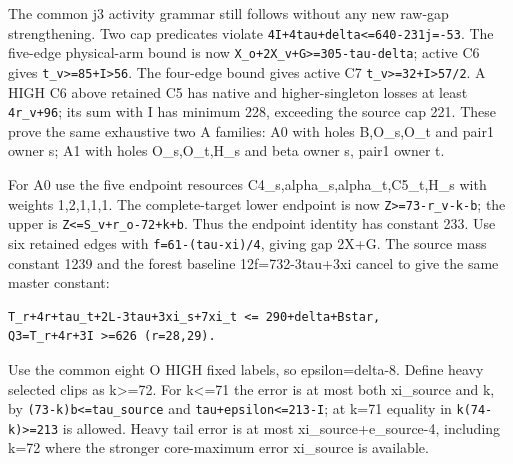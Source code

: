 \documentclass[10pt,a4paper]{article}
\theoremstyle{definition}
\begin{document}
The common j3 activity grammar still follows without any new raw-gap
strengthening. Two cap predicates violate
\texttt{4I+\allowbreak{}4tau+\allowbreak{}delta<=\allowbreak{}640-231j=\allowbreak{}-53}. The five-edge
physical-arm bound is now
\texttt{X\_\allowbreak{}\allowbreak{}o+\allowbreak{}2X\_\allowbreak{}\allowbreak{}v+\allowbreak{}G>=\allowbreak{}305-tau-delta}; active C6 gives
\texttt{t\_\allowbreak{}\allowbreak{}v>=\allowbreak{}85+\allowbreak{}I>56}. The four-edge bound gives
active C7 \texttt{t\_\allowbreak{}\allowbreak{}v>=\allowbreak{}32+\allowbreak{}I>57/\allowbreak{}2}. A HIGH C6 above
retained C5 has native and higher-singleton losses at least
\texttt{4r\_\allowbreak{}\allowbreak{}v+\allowbreak{}96}; its sum with I has minimum 228,\allowbreak{}
exceeding the source cap 221. These prove the same exhaustive two A
families: A0 with holes B,\allowbreak{}O\_\allowbreak{}s,\allowbreak{}O\_\allowbreak{}t and pair1 owner s; A1 with holes
O\_\allowbreak{}s,\allowbreak{}O\_\allowbreak{}t,\allowbreak{}H\_\allowbreak{}s and beta owner s,\allowbreak{} pair1 owner t.

For A0 use the five endpoint resources
C4\_\allowbreak{}s,\allowbreak{}alpha\_\allowbreak{}s,\allowbreak{}alpha\_\allowbreak{}t,\allowbreak{}C5\_\allowbreak{}t,\allowbreak{}H\_\allowbreak{}s with weights 1,\allowbreak{}2,\allowbreak{}1,\allowbreak{}1,\allowbreak{}1. The
complete-target lower endpoint is now
\texttt{Z>=\allowbreak{}73-r\_\allowbreak{}\allowbreak{}v-k-b}; the upper is
\texttt{Z<=\allowbreak{}S\_\allowbreak{}\allowbreak{}v+\allowbreak{}r\_\allowbreak{}\allowbreak{}o-72+\allowbreak{}k+\allowbreak{}b}. Thus the endpoint
identity has constant 233. Use six retained edges with
\texttt{f=\allowbreak{}61-(tau-xi)/\allowbreak{}4},\allowbreak{} giving gap 2X+\allowbreak{}G. The source
mass constant 1239 and the forest baseline 12f=\allowbreak{}732-3tau+\allowbreak{}3xi cancel to
give the same master constant:

\begin{lstlisting}
T_r+4r+tau_t+2L-3tau+3xi_s+7xi_t <= 290+delta+Bstar,
Q3=T_r+4r+3I >=626 (r=28,29).
\end{lstlisting}

Use the common eight O HIGH fixed labels,\allowbreak{} so epsilon=\allowbreak{}delta-8. Define
heavy selected clips as k\textgreater=\allowbreak{}72. For k\textless=\allowbreak{}71 the error is
at most both xi\_\allowbreak{}source and k,\allowbreak{} by
\texttt{(73-k)b<=\allowbreak{}tau\_\allowbreak{}\allowbreak{}source} and
\texttt{tau+\allowbreak{}epsilon<=\allowbreak{}213-I}; at k=\allowbreak{}71 equality in
\texttt{k(74-k)>=\allowbreak{}213} is allowed. Heavy tail error is
at most xi\_\allowbreak{}source+\allowbreak{}e\_\allowbreak{}source-4,\allowbreak{} including k=\allowbreak{}72 where the stronger
core-maximum error xi\_\allowbreak{}source is available.
\end{document}
